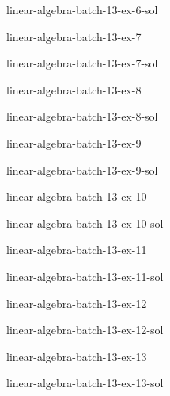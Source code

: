 \documentclass[preview]{standalone}
\begin{document}
\begin{snippetsolution}{linear-algebra-batch-13-ex-6-sol}{}
    \todo
\end{snippetsolution}

\begin{snippetexercise}{linear-algebra-batch-13-ex-7}{}
    \todo
\end{snippetexercise}

\begin{snippetsolution}{linear-algebra-batch-13-ex-7-sol}{}
    \todo
\end{snippetsolution}

\begin{snippetexercise}{linear-algebra-batch-13-ex-8}{}
    \todo
\end{snippetexercise}

\begin{snippetsolution}{linear-algebra-batch-13-ex-8-sol}{}
    \todo
\end{snippetsolution}

\begin{snippetexercise}{linear-algebra-batch-13-ex-9}{}
    \todo
\end{snippetexercise}

\begin{snippetsolution}{linear-algebra-batch-13-ex-9-sol}{}
    \todo
\end{snippetsolution}

\begin{snippetexercise}{linear-algebra-batch-13-ex-10}{}
    \todo
\end{snippetexercise}

\begin{snippetsolution}{linear-algebra-batch-13-ex-10-sol}{}
    \todo
\end{snippetsolution}

\begin{snippetexercise}{linear-algebra-batch-13-ex-11}{}
    \todo
\end{snippetexercise}

\begin{snippetsolution}{linear-algebra-batch-13-ex-11-sol}{}
    \todo
\end{snippetsolution}

\begin{snippetexercise}{linear-algebra-batch-13-ex-12}{}
    \todo
\end{snippetexercise}

\begin{snippetsolution}{linear-algebra-batch-13-ex-12-sol}{}
    \todo
\end{snippetsolution}

\begin{snippetexercise}{linear-algebra-batch-13-ex-13}{}
    \todo
\end{snippetexercise}

\begin{snippetsolution}{linear-algebra-batch-13-ex-13-sol}{}
    \todo
\end{snippetsolution}
\end{document}
